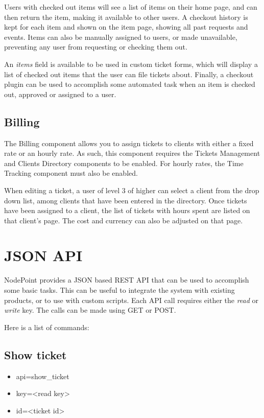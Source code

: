 \documentclass[11pt]{article}
\begin{document}
Users with checked out items will see a list of items on their home page, and can then return the item, making it available to other users. A checkout history is kept for each item and shown on the item page, showing all past requests and events. Items can also be manually assigned to users, or made unavailable, preventing any user from requesting or checking them out.

An \textit{items} field is available to be used in custom ticket forms, which will display a list of checked out items that the user can file tickets about. Finally, a checkout plugin can be used to accomplish some automated task when an item is checked out, approved or assigned to a user.

\subsection{Billing}
The Billing component allows you to assign tickets to clients with either a fixed rate or an hourly rate. As such, this component requires the Tickets Management and Clients Directory components to be enabled. For hourly rates, the Time Tracking component must also be enabled.

When editing a ticket, a user of level 3 of higher can select a client from the drop down list, among clients that have been entered in the directory. Once tickets have been assigned to a client, the list of tickets with hours spent are listed on that client's page. The cost and currency can also be adjusted on that page.

\clearpage
\section{JSON API}
NodePoint provides a JSON based REST API that can be used to accomplish some basic tasks. This can be useful to integrate the system with existing products, or to use with custom scripts. Each API call requires either the \textit{read} or \textit{write} key. The calls can be made using GET or POST.

Here is a list of commands:

\subsection{Show ticket}

\begin{itemize}
\item api=show\_ticket
\item key=<read key>
\item id=<ticket id>
\end{itemize}
\end{document}
